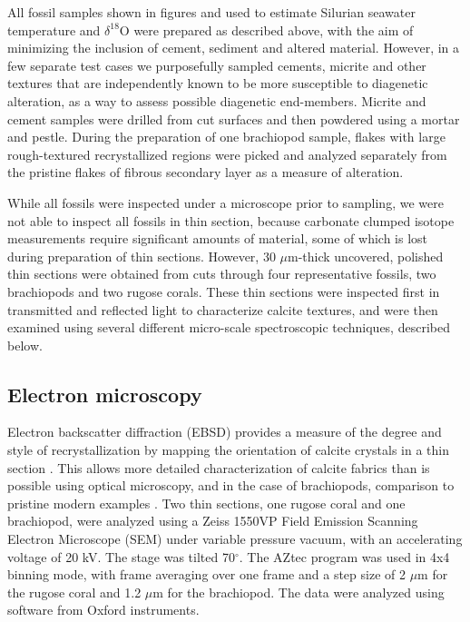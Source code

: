 \documentclass[preprint, authoryear]{elsarticle}
\begin{document}
All fossil samples shown in figures and used to estimate Silurian seawater temperature and $\delta^{18}$O were prepared as described above, with the aim of minimizing the inclusion of cement, sediment and altered material. However, in a few separate test cases we purposefully sampled cements, micrite and other textures that are independently known to be more susceptible to diagenetic alteration, as a way to assess possible diagenetic end-members. Micrite and cement samples were drilled from cut surfaces and then powdered using a mortar and pestle. During the preparation of one brachiopod sample, flakes with large rough-textured recrystallized regions were picked and analyzed separately from the pristine flakes of fibrous secondary layer as a measure of alteration. 

While all fossils were inspected under a microscope prior to sampling, we were not able to inspect all fossils in thin section, because carbonate clumped isotope measurements require significant amounts of material, some of which is lost during preparation of thin sections. However, 30 $\mu$m-thick uncovered, polished thin sections were obtained from cuts through four representative fossils, two brachiopods and two rugose corals. These thin sections were inspected first in transmitted and reflected light to characterize calcite textures, and were then examined using several different micro-scale spectroscopic techniques, described below. 

\subsection{Electron microscopy}

Electron backscatter diffraction (EBSD) provides a measure of the degree and style of recrystallization by mapping the orientation of calcite crystals in a thin section \citep[e.g.][]{Bergmann2013}. This allows more detailed characterization of calcite fabrics than is possible using optical microscopy, and in the case of brachiopods, comparison to pristine modern examples \citep{PerezHuerta2007}. Two thin sections, one rugose coral and one brachiopod, were analyzed using a Zeiss 1550VP Field Emission Scanning Electron Microscope (SEM) under variable pressure vacuum, with an accelerating voltage of 20 kV. The stage was tilted 70$^{\circ}$. The AZtec program was used in 4x4 binning mode, with frame averaging over one frame and a step size of 2 $\mu$m for the rugose coral and 1.2 $\mu$m for the brachiopod. The data were analyzed using software from Oxford instruments.
\end{document}

